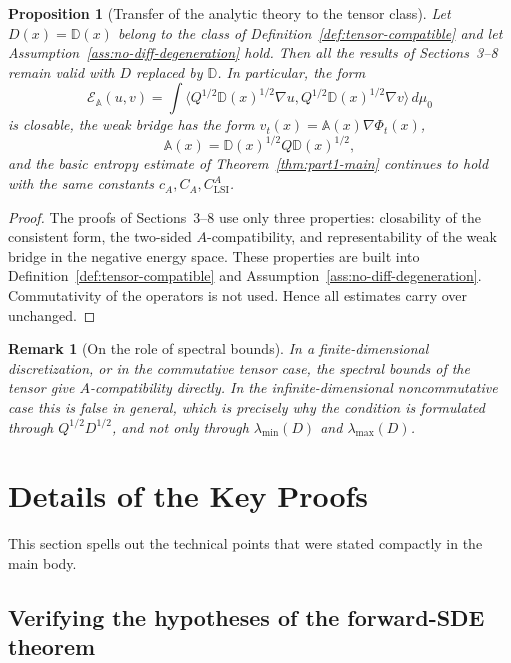 \documentclass{article}
\newtheorem{proposition}[theorem]{Proposition}
\newtheorem{remark}[theorem]{Remark}
\begin{document}
\begin{proposition}[Transfer of the analytic theory to the tensor class]
\label{prop:tensor-transfer}
Let \(D(x)=\mathbb D(x)\) belong to the class of
Definition~\ref{def:tensor-compatible} and let
Assumption~\ref{ass:no-diff-degeneration} hold. Then all the results of
Sections~3--8 remain valid with \(D\) replaced by \(\mathbb D\). In
particular, the form
\[
        \mathcal E_{\mathbb A}(u,v)
        =
        \int
        \langle Q^{1/2}\mathbb D(x)^{1/2}\nabla u,
        Q^{1/2}\mathbb D(x)^{1/2}\nabla v\rangle\,d\mu_0
\]
is closable, the weak bridge has the form
\(v_t(x)=\mathbb A(x)\nabla\Phi_t(x)\),
\[
        \mathbb A(x)=\mathbb D(x)^{1/2}Q\mathbb D(x)^{1/2},
\]
and the basic entropy estimate of Theorem~\ref{thm:part1-main} continues to
hold with the same constants \(c_A,C_A,C_{\mathrm{LSI}}^A\).
\end{proposition}

\begin{proof}
The proofs of Sections~3--8 use only three properties: closability of the
consistent form, the two-sided \(A\)-compatibility, and representability of
the weak bridge in the negative energy space. These properties are built into
Definition~\ref{def:tensor-compatible} and
Assumption~\ref{ass:no-diff-degeneration}. Commutativity of the operators is
not used. Hence all estimates carry over unchanged.
\end{proof}

\begin{remark}[On the role of spectral bounds]
In a finite-dimensional discretization, or in the commutative tensor case,
the spectral bounds of the tensor give \(A\)-compatibility directly. In the
infinite-dimensional noncommutative case this is false in general, which is
precisely why the condition is formulated through \(Q^{1/2}D^{1/2}\), and not
only through \(\lambda_{\min}(D)\) and \(\lambda_{\max}(D)\).
\end{remark}

\section{Details of the Key Proofs}
\label{sec:part1-proof-details}

This section spells out the technical points that were stated compactly in the
main body.

\subsection{Verifying the hypotheses of the forward-SDE theorem}
\end{document}
